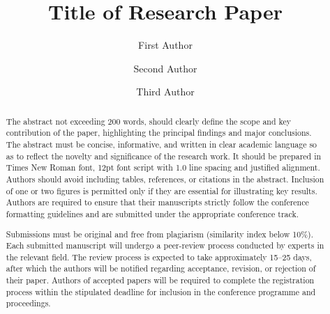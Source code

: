 \documentclass{icapst}
\title{Title of Research Paper}
\author[a*]{First Author}
\author[b]{Second Author}
\author[c]{Third Author}
\affil[a]{Department1, Institute1, City1, Country1}
\affil[b]{Department2, Institute2, City2, Country2}
\affil[c]{Department3, Institute3, City3, Country3}
\begin{document}
\maketitle
\begin{abstract}
The abstract not exceeding 200 words, should clearly define the scope and key contribution of the paper, highlighting the principal findings and major conclusions. The abstract must be concise, informative, and written in clear academic language so as to reflect the novelty and significance of the research work. It should be prepared in Times New Roman font, 12pt font script with 1.0 line spacing and justified alignment. Authors should avoid including tables, references, or citations in the abstract. Inclusion of one or two figures is permitted only if they are essential for illustrating key results. Authors are required to ensure that their manuscripts strictly follow the conference formatting guidelines and are submitted under the appropriate conference track.

Submissions must be original and free from plagiarism (similarity index below 10\%). Each submitted manuscript will undergo a peer-review process conducted by experts in the relevant field. The review process is expected to take approximately 15--25 days, after which the authors will be notified regarding acceptance, revision, or rejection of their paper. Authors of accepted papers will be required to complete the registration process within the stipulated deadline for inclusion in the conference programme and proceedings.
\end{abstract}
\end{document}
